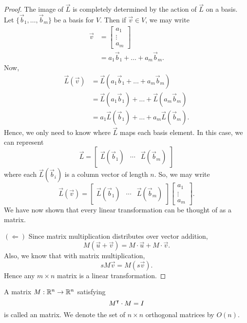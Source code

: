 \documentclass{ximera}
\begin{document}
\begin{lemma}
\begin{proof}
    The image of $\vec{L}$ is completely determined by the action of
    $\vec{L}$ on a basis. Let $\{\vec{b}_1,\dots,\vec{b}_m\}$ be a
    basis for $V$. Then if $\vec{v}\in V$, we may write
    \begin{align*}
      \vec{v} &= \begin{bmatrix}
        a_1\\
        \vdots \\
        a_m
        \end{bmatrix}\\
      &=a_1\vec{b}_1 + \dots + a_m\vec{b}_m.
    \end{align*}
    Now,
    \begin{align*}
      \vec{L}(\vec{v})&=\vec{L}(a_1\vec{b}_1 + \dots + a_m\vec{b}_m)\\
      &= \vec{L}(a_1\vec{b}_1) + \dots + \vec{L}(a_m\vec{b}_m) \\
      &= a_1\vec{L}(\vec{b}_1) + \dots + a_m\vec{L}(\vec{b}_m).
    \end{align*}
    Hence, we only need to know where $\vec{L}$ maps each basis
    element. In this case, we can represent
    \[
    \vec{L} = \begin{bmatrix}
      \vec{L}(\vec{b}_1) & \cdots & \vec{L}(\vec{b}_m)
    \end{bmatrix}
    \]
    where each $\vec{L}(\vec{b}_i)$ is a column vector of length $n$.
    So, we may write
    \[
    \vec{L}(\vec{v}) = \begin{bmatrix}
      \vec{L}(\vec{b}_1) & \cdots & \vec{L}(\vec{b}_m)
    \end{bmatrix} \begin{bmatrix}
        a_1\\
        \vdots \\
        a_m
        \end{bmatrix}.
    \]
    We have now shown that every linear transformation can be thought of as a matrix.

      $(\Leftarrow)$ Since matrix multiplication distributes over
      vector addition,
      \[
      M(\vec{u}+\vec{v})  = M\cdot \vec{u} + M\cdot \vec{v}.
      \]
      Also, we know that with matrix multiplication,
      \[
      s M \vec{v} = M(s\vec{v}).
      \]
      Hence any $m\times n$ matrix is a linear transformation.
  \end{proof}
\end{lemma}



\begin{definition}
  A matrix $M:\mathbb R^n\to \mathbb R^n$ satisfying
  \[
  M^\intercal \cdot M=I
  \]
  is called an  matrix. We denote the set of $n\times
  n$ orthogonal matrices by $O(n)$.
\end{definition}
\end{document}
